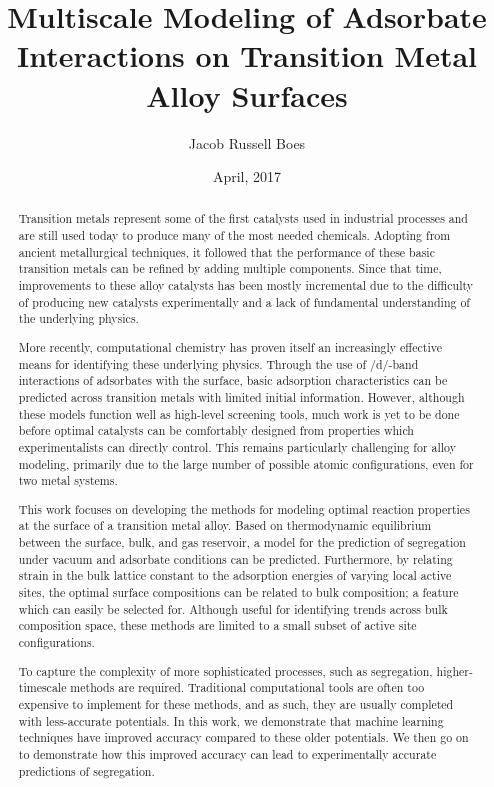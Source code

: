 \documentclass[12pt]{cmuthesis}
\author{Jacob Russell Boes}
\date{April, 2017}
\title{Multiscale Modeling of Adsorbate Interactions on Transition Metal Alloy Surfaces}
\begin{document}
\maketitle

\frontmatter
{}

\begin{abstract}
Transition metals represent some of the first catalysts used in industrial processes and are still used today to produce many of the most needed chemicals. Adopting from ancient metallurgical techniques, it followed that the performance of these basic transition metals can be refined by adding multiple components. Since that time, improvements to these alloy catalysts has been mostly incremental due to the difficulty of producing new catalysts experimentally and a lack of fundamental understanding of the underlying physics.

More recently, computational chemistry has proven itself an increasingly effective means for identifying these underlying physics. Through the use of /d/-band interactions of adsorbates with the surface, basic adsorption characteristics can be predicted across transition metals with limited initial information. However, although these models function well as high-level screening tools, much work is yet to be done before optimal catalysts can be comfortably designed from properties which experimentalists can directly control. This remains particularly challenging for alloy modeling, primarily due to the large number of possible atomic configurations, even for two metal systems.

This work focuses on developing the methods for modeling optimal reaction properties at the surface of a transition metal alloy. Based on thermodynamic equilibrium between the surface, bulk, and gas reservoir, a model for the prediction of segregation under vacuum and adsorbate conditions can be predicted. Furthermore, by relating strain in the bulk lattice constant to the adsorption energies of varying local active sites, the optimal surface compositions can be related to bulk composition; a feature which can easily be selected for. Although useful for identifying trends across bulk composition space, these methods are limited to a small subset of active site configurations.

To capture the complexity of more sophisticated processes, such as segregation, higher-timescale methods are required. Traditional computational tools are often too expensive to implement for these methods, and as such, they are usually completed with less-accurate potentials. In this work, we demonstrate that machine learning techniques have improved accuracy compared to these older potentials. We then go on to demonstrate how this improved accuracy can lead to experimentally accurate predictions of segregation.
\end{abstract}
\end{document}
